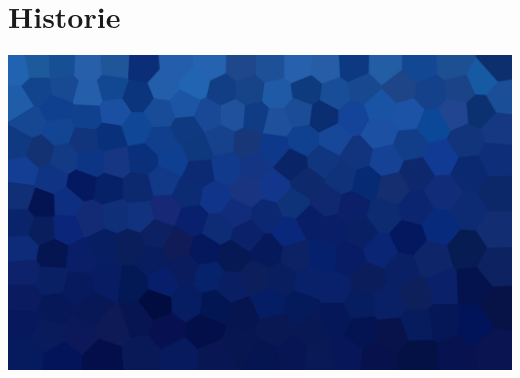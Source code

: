 \documentclass[aspectratio=169,xcolor=dvipsnames, t]{beamer}
\begin{document}
\section{Historie}
{
    \includegraphics[width=\paperwidth,height=\paperheight]{AICStyleData/logos/mene_polygonu_bg.png}
}
\end{document}
